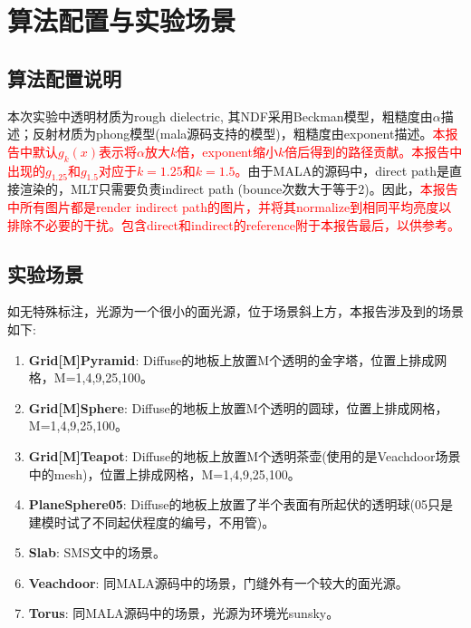 \section{算法配置与实验场景}
\label{sec:desc}
\subsection{算法配置说明}
本次实验中透明材质为rough dielectric, 其NDF采用Beckman模型，粗糙度由$\alpha$描述；反射材质为phong模型(mala源码支持的模型)，粗糙度由exponent描述。\textcolor{red}{本报告中默认$g_k(x)$表示将$\alpha$放大$k$倍，exponent缩小$k$倍后得到的路径贡献。本报告中出现的$g_{1.25}$和$g_{1.5}$对应于$k=1.25$和$k=1.5$。}由于MALA的源码中，direct path是直接渲染的，MLT只需要负责indirect path (bounce次数大于等于2)。因此，\textcolor{red}{本报告中所有图片都是render indirect path的图片，并将其normalize到相同平均亮度以排除不必要的干扰。包含direct和indirect的reference附于本报告最后，以供参考。}

\subsection{实验场景}
如无特殊标注，光源为一个很小的面光源，位于场景斜上方，本报告涉及到的场景如下:

\begin{enumerate}[(1)]
    \item \textbf{Grid[M]Pyramid}: Diffuse的地板上放置M个透明的金字塔，位置上排成网格，M=1,4,9,25,100。
    \item \textbf{Grid[M]Sphere}: Diffuse的地板上放置M个透明的圆球，位置上排成网格，M=1,4,9,25,100。
    \item \textbf{Grid[M]Teapot}: Diffuse的地板上放置M个透明茶壶(使用的是Veachdoor场景中的mesh)，位置上排成网格，M=1,4,9,25,100。
    \item \textbf{PlaneSphere05}: Diffuse的地板上放置了半个表面有所起伏的透明球(05只是建模时试了不同起伏程度的编号，不用管)。
    \item \textbf{Slab}: SMS文中的场景。
    \item \textbf{Veachdoor}: 同MALA源码中的场景，门缝外有一个较大的面光源。
    \item \textbf{Torus}: 同MALA源码中的场景，光源为环境光sunsky。
\end{enumerate}






